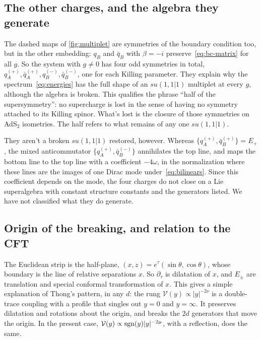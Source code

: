 \subsection{The other charges, and the algebra they generate}

The dashed maps of \cref{fig:multiplet} are symmetries of the boundary condition too, but in the other embedding: $q_B$ and $\bar q_B$ with $\beta=-i$ preserve~\eqref{eq:bc-matrix} for all $g$. So the system with $g\neq0$ has four odd symmetries in total, $q_A^{(+)},\bar q_A^{(+)},q_B^{(-)},\bar q_B^{(-)}$, one for each Killing parameter. They explain why the spectrum~\eqref{eq:energies} has the full shape of an $su(1,1|1)$ multiplet at every $g$, although the algebra is broken. This qualifies the phrase ``half of the supersymmetry'': no supercharge is lost in the sense of having no symmetry attached to its Killing spinor. What's lost is the closure of those symmetries on AdS$_2$ isometries. The half refers to what remains of any one $su(1,1|1)$.

They aren't a broken $su(1,1|1)$ restored, however. Whereas $\{q_A^{(+)},\bar q_B^{(+)}\}=E_+$, the mixed anticommutator $\{q_A^{(+)},\bar q_B^{(-)}\}$ annihilates the top line, and maps the bottom line to the top line with a coefficient $-4\omega$, in the normalization where these lines are the images of one Dirac mode under~\eqref{eq:bilinears}. Since this coefficient depends on the mode, the four charges do not close on a Lie superalgebra with constant structure constants and the generators listed. We have not classified what they do generate.

\subsection{Origin of the breaking, and relation to the CFT}

The Euclidean strip is the half-plane, $(x,z)=e^\tau(\sin\theta,\cos\theta)$, whose boundary is the line of relative separations $x$. So $\partial_\tau$ is dilatation of $x$, and $E_\pm$ are translation and special conformal transformation of $x$. This gives a simple explanation of Thong's pattern, in any $d$: the rung $\mathcal V(y)\propto|y|^{-2\nu}$ is a double-trace coupling with a profile that singles out $y=0$ and $y=\infty$. It preserves dilatation and rotations about the origin, and breaks the $2d$ generators that move the origin. In the present case, $\mathcal V(y)\propto\operatorname{sgn}(y)|y|^{-2\mu}$, with a reflection, does the same.

